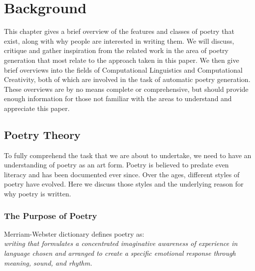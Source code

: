 
\chapter{Background}
\ifpdf
    \graphicspath{{Design/DesignFigs/PNG/}{Design/DesignFigs/PDF/}{Design/DesignFigs/}}
\else
    \graphicspath{{Design/DesignFigs/EPS/}{Design/DesignFigs/}}
\fi

This chapter gives a brief overview of the features and classes of poetry that exist, along with why people are interested in writing them. We will discuss, critique and gather inspiration from the related work in the area of poetry generation that most relate to the approach taken in this paper. We then give brief overviews into the fields of Computational Linguistics and Computational Creativity, both of which are involved in the task of automatic poetry generation. These overviews are by no means complete or comprehensive, but should provide enough information for those not familiar with the areas to understand and appreciate this paper.

\section{Poetry Theory}

To fully comprehend the task that we are about to undertake, we need to have an understanding of poetry as an art form. Poetry is believed to predate even literacy and has been documented ever since. Over the ages, different styles of poetry have evolved. Here we discuss those styles and the underlying reason for why poetry is written.

\subsection{The Purpose of Poetry}
\label{sec:purpose}
Merriam-Webster dictionary defines poetry as:\\
\emph{writing that formulates a concentrated imaginative awareness of experience in language chosen and arranged to create a specific emotional response through meaning, sound, and rhythm.}

